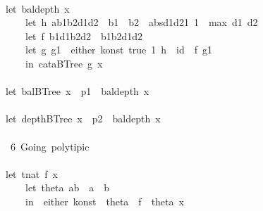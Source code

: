 \documentclass[a4paper]{article}
\begin{document}
\begin{tabbing}
\ttfamily ~\\
\ttfamily ~let~baldepth~x~~\\
\ttfamily ~~~~~let~h~ab1b2d1d2~~b1~~b2~~absd1d21~1~~max~d1~d2\\
\ttfamily ~~~~~let~f~b1d1b2d2~~b1b2d1d2\\
\ttfamily ~~~~~let~g~g1~~either~konst~true~1~h~~id~~f~g1\\
\ttfamily ~~~~~in~cataBTree~g~x\\
\ttfamily ~\\
\ttfamily ~let~balBTree~x~~p1~~baldepth~x\\
\ttfamily ~\\
\ttfamily ~let~depthBTree~x~~p2~~baldepth~x\\
\ttfamily ~\\
\ttfamily ~~6~Going~polytipic~\\
\ttfamily ~\\
\ttfamily ~let~tnat~f~x~\\
\ttfamily ~~~~~let~theta~ab~~a~~b\\
\ttfamily ~~~~~in~~either~konst~~theta~~f~~theta~x\\
\ttfamily ~\\

\end{tabbing}
\end{document}
